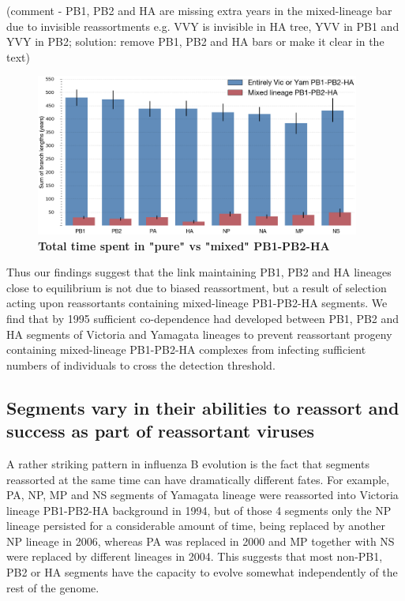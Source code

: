 \documentclass[11pt,oneside,letterpaper]{article}
\begin{document}
(comment - PB1, PB2 and HA are missing extra years in the mixed-lineage bar due to invisible reassortments e.g. VVY is invisible in HA tree, YVV in PB1 and YVY in PB2; solution: remove PB1, PB2 and HA bars or make it clear in the text)
\begin{figure}[h]
	\centering		
	\includegraphics[width=0.95\textwidth]{figures/InfB_stateTime.png}
	\caption{\textbf{Total time spent in "pure" vs "mixed" PB1-PB2-HA}}
	\label{stateTime}
\end{figure}

Thus our findings suggest that the link maintaining PB1, PB2 and HA lineages close to equilibrium is not due to biased reassortment, but a result of selection acting upon reassortants containing mixed-lineage PB1-PB2-HA segments.
We find that by 1995 sufficient co-dependence had developed between PB1, PB2 and HA segments of Victoria and Yamagata lineages to prevent reassortant progeny containing mixed-lineage PB1-PB2-HA complexes from infecting sufficient numbers of individuals to cross the detection threshold.

\subsection*{Segments vary in their abilities to reassort and success as part of reassortant viruses}
A rather striking pattern in influenza B evolution is the fact that segments reassorted at the same time can have dramatically different fates.
For example, PA, NP, MP and NS segments of Yamagata lineage were reassorted into Victoria lineage PB1-PB2-HA background in 1994, but of those 4 segments only the NP lineage persisted for a considerable amount of time, being replaced by another NP lineage in 2006, whereas PA was replaced in 2000 and MP together with NS were replaced by different lineages in 2004.
This suggests that most non-PB1, PB2 or HA segments have the capacity to evolve somewhat independently of the rest of the genome.
\end{document}
